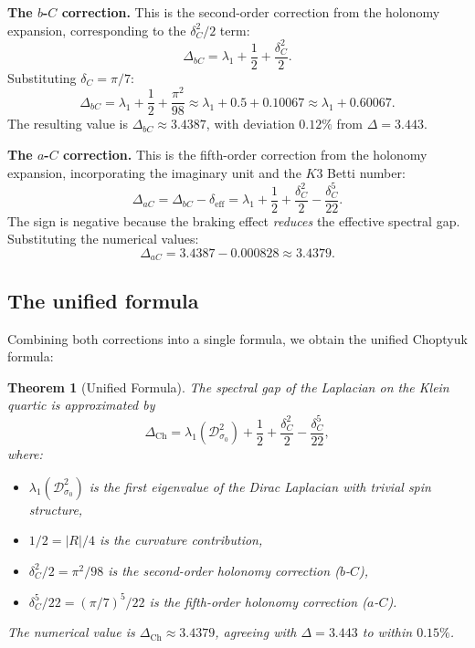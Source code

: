 \documentclass[12pt,a4paper]{article}
\newtheorem{theorem}{Theorem}[section]
\theoremstyle{definition}
\theoremstyle{remark}
\newcommand{\cD}{\mathcal{D}}
\begin{document}
\medskip

\noindent\textbf{The $b$-$C$ correction.} This is the second-order correction from the holonomy expansion, corresponding to the $\delta_C^2/2$ term:
\begin{equation}
\Delta_{bC} = \lambda_1 + \frac{1}{2} + \frac{\delta_C^2}{2}.
\end{equation}
Substituting $\delta_C = \pi/7$:
\begin{equation}
\Delta_{bC} = \lambda_1 + \frac{1}{2} + \frac{\pi^2}{98} \approx \lambda_1 + 0.5 + 0.10067 \approx \lambda_1 + 0.60067.
\end{equation}
The resulting value is $\Delta_{bC} \approx 3.4387$, with deviation $0.12\%$ from $\Delta = 3.443$.

\medskip

\noindent\textbf{The $a$-$C$ correction.} This is the fifth-order correction from the holonomy expansion, incorporating the imaginary unit and the $K3$ Betti number:
\begin{equation}
\Delta_{aC} = \Delta_{bC} - \delta_{\mathrm{eff}} = \lambda_1 + \frac{1}{2} + \frac{\delta_C^2}{2} - \frac{\delta_C^5}{22}.
\end{equation}
The sign is negative because the braking effect \emph{reduces} the effective spectral gap. Substituting the numerical values:
\begin{equation}
\Delta_{aC} = 3.4387 - 0.000828 \approx 3.4379.
\end{equation}

\subsection{The unified formula}

Combining both corrections into a single formula, we obtain the unified Choptyuk formula:

\begin{theorem}[Unified Formula]
\label{thm:unified}
The spectral gap of the Laplacian on the Klein quartic is approximated by
\begin{equation}
\Delta_{\mathrm{Ch}} = \lambda_1(\cD^2_{\sigma_0}) + \frac{1}{2} + \frac{\delta_C^2}{2} - \frac{\delta_C^5}{22},
\end{equation}
where:
\begin{itemize}
\item $\lambda_1(\cD^2_{\sigma_0})$ is the first eigenvalue of the Dirac Laplacian with trivial spin structure,
\item $1/2 = |R|/4$ is the curvature contribution,
\item $\delta_C^2/2 = \pi^2/98$ is the second-order holonomy correction ($b$-$C$),
\item $\delta_C^5/22 = (\pi/7)^5/22$ is the fifth-order holonomy correction ($a$-$C$).
\end{itemize}
The numerical value is $\Delta_{\mathrm{Ch}} \approx 3.4379$, agreeing with $\Delta = 3.443$ to within $0.15\%$.
\end{theorem}
\end{document}
